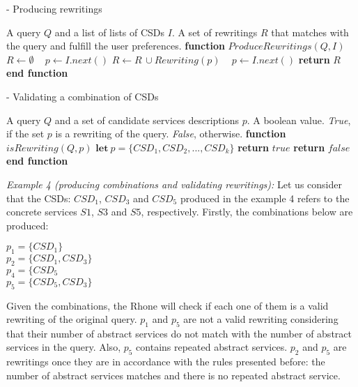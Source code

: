 \begin{algorithm}[h!]
\small
\caption{ - Producing rewritings}
\label{rewriting}
\begin{algorithmic}[1]
\REQUIRE A query $Q$ and a list of lists of CSDs $I$.
\ENSURE A set of rewritings $R$ that matches with the query and fulfill the user preferences.
\STATE \textbf{function} $\mathit{ProduceRewritings} (Q, I)$
	\STATE $R\leftarrow \emptyset$
	\STATE ~\! 
    \STATE $p \leftarrow I.next()$
			\STATE $R\leftarrow R\,\cup \mathit{Rewriting}(p)$
			\STATE ~\!
		\ENDIF
		\STATE $p \leftarrow I.\mathit{next}()$
	\ENDWHILE
    \STATE \textbf{return} $R$
\STATE \textbf{end function}
\end{algorithmic}
\end{algorithm}



\begin{algorithm}
\caption{ - Validating a combination of CSDs}
\label{isrewriting}
\begin{algorithmic}[1]
\REQUIRE A query $Q$ and a set of candidate services descriptions $p$.
\ENSURE A boolean value. \textit{True}, if the set $p$ is a rewriting of the query. \textit{False}, otherwise.
\STATE \textbf{function} $\mathit{isRewriting} (Q, p)$
\STATE  $\mathbf{let} \ p = \lbrace CSD_{1}, CSD_{2}, ..., CSD_{k} \rbrace$
	\STATE \textbf{return} $true$		
\ENDIF
\STATE \textbf{return} $false$
\STATE \textbf{end function}
\end{algorithmic}
\end{algorithm}

\bigskip
\noindent \textit{Example 4 (producing combinations and validating rewritings):} 
Let us consider that the CSDs: $CSD_{1}$, $CSD_{3}$ and $CSD_{5}$ produced in the example 4 
refers to the concrete services $S1$, $S3$ and $S5$, respectively. 
Firstly, the combinations below are produced:
\begin{flushleft}
$p_{1} = \lbrace CSD_{1} \rbrace$ \\
$p_{2} = \lbrace CSD_{1}, CSD_{3} \rbrace$ \\
$p_{4} = \lbrace CSD_{5}$ \\
$p_{5} = \lbrace CSD_{5}, CSD_{3} \rbrace$ 
\end{flushleft}
Given the combinations, the Rhone will check if each one of them is a valid rewriting of 
the original query. $p_{1}$ and $p_{5}$ are not a valid rewriting considering that their number
of abstract services do not match with the number of abstract services in the query. Also, $p_{5}$
contains repeated abstract services. $p_{2}$ and $p_{5}$ are rewritings once they are in accordance
with the rules presented before: the number of abstract services matches and there is no repeated abstract 
service. 
